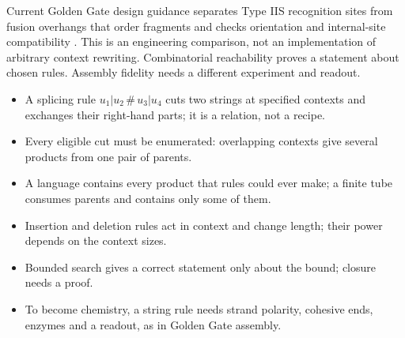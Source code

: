 Current Golden Gate design guidance separates Type IIS recognition sites
from fusion overhangs that order fragments and checks orientation and internal-site
compatibility \cite{NEBGoldenGate}. This is an engineering comparison, not an implementation
of arbitrary context rewriting. Combinatorial reachability proves a statement
about chosen rules. Assembly fidelity needs a different experiment and readout.

\begin{KeyIdeas}
\begin{itemize}\setlength{\itemsep}{2pt}
\item A splicing rule $u_1|u_2\,\#\,u_3|u_4$ cuts two strings at specified contexts
and exchanges their right-hand parts; it is a relation, not a recipe.
\item Every eligible cut must be enumerated: overlapping contexts give several
products from one pair of parents.
\item A language contains every product that rules could ever make; a finite
tube consumes parents and contains only some of them.
\item Insertion and deletion rules act in context and change length; their power
depends on the context sizes.
\item Bounded search gives a correct statement only about the bound; closure
needs a proof.
\item To become chemistry, a string rule needs strand polarity, cohesive ends,
enzymes and a readout, as in Golden Gate assembly.
\end{itemize}
\end{KeyIdeas}

